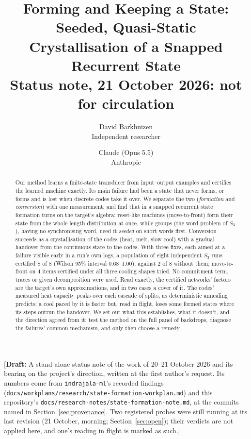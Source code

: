 \documentclass[11pt]{article}
\title{Forming and Keeping a State:\\Seeded, Quasi-Static Crystallisation of a Snapped Recurrent State\\[0.5em]
\large Status note, 21 October 2026: not for circulation}
\author{
  David Barkhuizen\\
  Independent researcher
  \and
  Claude (Opus 5.5)\\
  Anthropic
}
\date{}
\newcommand{\draftnote}[1]{\textcolor{red!70!black}{[\textbf{Draft:} #1]}}
\begin{document}
\maketitle

\draftnote{A stand-alone status note of the work of 20--21 October 2026 and its bearing on the
project's direction, written at the first author's request. Its numbers come from
\texttt{indrajala-ml}'s recorded findings (\texttt{docs/workplans/research/state-formation-workplan.md}) and
this repository's \texttt{docs/research-notes/state-formation-note.md}, at the commits named in Section~\ref{sec:provenance}. Two
registered probes were still running at its last revision (21 October, morning;
Section~\ref{sec:open}); their verdicts are not applied here, and one's reading in flight is marked
as such.}

\begin{abstract}
Our method learns a finite-state transducer from input--output examples and certifies the learned
machine exactly. Its main failure had been a state that never forms, or forms and is lost when
discrete codes take it over. We separate the two (\emph{formation} and \emph{conversion}) with one
measurement, and find that in a snapped recurrent state formation turns on the target's algebra: reset-like machines
(move-to-front) form their state from the whole length distribution at once, while groups (the word
problem of $S_3$), having no synchronising word, need it \emph{seeded} on short words first.
Conversion succeeds as a crystallisation of the codes (heat, melt, slow cool) with a gradual
handover from the continuous state to the codes. With three fixes, each aimed at a failure visible
early in a run's own logs, a population of eight independent $S_3$ runs certified 8 of 8 (Wilson
95\% interval 0.68--1.00), against 2 of 8 without them; move-to-front on 4 items certified under
all three cooling shapes tried. No commitment term, traces or given decomposition were used.
Read exactly, the certified networks' factors are the target's own approximations, and in two
cases a cover of it. The codes' measured heat capacity peaks over each cascade of splits, as
deterministic annealing predicts; a cool paced by it is faster but, read in flight, loses some
formed states where its steps outrun the handover. We set out what this establishes, what it doesn't, and the direction agreed
from it: test the method on the full panel of backdrops, diagnose the failures' common mechanism,
and only then choose a remedy.
\end{abstract}
\end{document}
